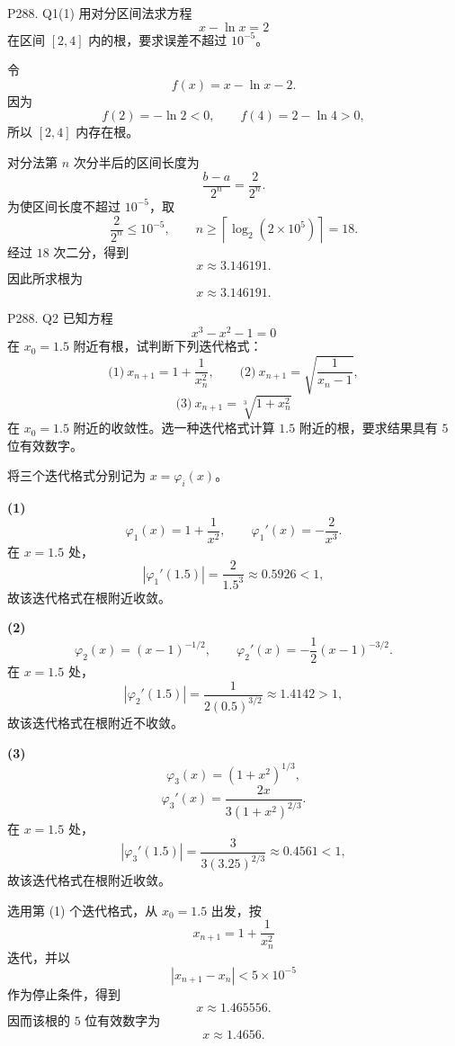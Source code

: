 \documentclass[11pt, a4paper, fontset=none]{ctexart}
\begin{document}
\begin{problem}{P288. Q1(1)}
    用对分区间法求方程
    \[
        x-\ln x=2
    \]
    在区间 $[2,4]$ 内的根，要求误差不超过 $10^{-5}$。
\end{problem}

\begin{solution}
    令
    \[
        f(x)=x-\ln x-2.
    \]
    因为
    \[
        f(2)=-\ln 2<0,\qquad
        f(4)=2-\ln 4>0,
    \]
    所以 $[2,4]$ 内存在根。

    对分法第 $n$ 次分半后的区间长度为
    \[
        \frac{b-a}{2^n}=\frac{2}{2^n}.
    \]
    为使区间长度不超过 $10^{-5}$，取
    \[
        \frac{2}{2^n}\le 10^{-5},
        \qquad n\ge \left\lceil \log_2(2\times 10^5)\right\rceil=18.
    \]
    经过 $18$ 次二分，得到
    \[
        x\approx 3.146191.
    \]
    因此所求根为
    \[
        \boxed{x\approx 3.146191}.
    \]
\end{solution}


\begin{problem}{P288. Q2}
    已知方程
    \[
        x^3-x^2-1=0
    \]
    在 $x_0=1.5$ 附近有根，试判断下列迭代格式：
    \[
        \text{(1)}\ x_{n+1}=1+\frac{1}{x_n^2},\qquad
        \text{(2)}\ x_{n+1}=\sqrt{\frac{1}{x_n-1}},
    \]
    \[
        \text{(3)}\ x_{n+1}=\sqrt[3]{1+x_n^2}
    \]
    在 $x_0=1.5$ 附近的收敛性。选一种迭代格式计算 $1.5$ 附近的根，要求结果具有 $5$ 位有效数字。
\end{problem}

\begin{solution}
    将三个迭代格式分别记为 $x=\varphi_i(x)$。

    \textbf{(1)}
    \[
        \varphi_1(x)=1+\frac{1}{x^2},\qquad
        \varphi_1'(x)=-\frac{2}{x^3}.
    \]
    在 $x=1.5$ 处，
    \[
        |\varphi_1'(1.5)|=\frac{2}{1.5^3}\approx 0.5926<1,
    \]
    故该迭代格式在根附近收敛。

    \textbf{(2)}
    \[
        \varphi_2(x)=(x-1)^{-1/2},\qquad
        \varphi_2'(x)=-\frac{1}{2}(x-1)^{-3/2}.
    \]
    在 $x=1.5$ 处，
    \[
        |\varphi_2'(1.5)|=\frac{1}{2(0.5)^{3/2}}\approx 1.4142>1,
    \]
    故该迭代格式在根附近不收敛。

    \textbf{(3)}
    \[
        \varphi_3(x)=(1+x^2)^{1/3},
    \]
    \[
        \varphi_3'(x)=\frac{2x}{3(1+x^2)^{2/3}}.
    \]
    在 $x=1.5$ 处，
    \[
        |\varphi_3'(1.5)|
        =\frac{3}{3(3.25)^{2/3}}
        \approx 0.4561<1,
    \]
    故该迭代格式在根附近收敛。

    选用第 (1) 个迭代格式，从 $x_0=1.5$ 出发，按
    \[
        x_{n+1}=1+\frac{1}{x_n^2}
    \]
    迭代，并以
    \[
        |x_{n+1}-x_n|<5\times 10^{-5}
    \]
    作为停止条件，得到
    \[
        x\approx 1.465556.
    \]
    因而该根的 $5$ 位有效数字为
    \[
        \boxed{x\approx 1.4656}.
    \]
\end{solution}
\end{document}
